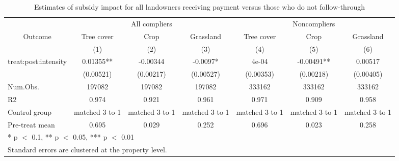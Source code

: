 \begin{table}[!h]
\centering\centering
\caption{\label{tab:twfe-compliers}Estimates of subsidy impact for all landowners receiving payment versus those who do not follow-through}
\centering
\begin{tabular}[t]{lcccccc}
\toprule
\multicolumn{1}{c}{ } & \multicolumn{3}{c}{All compliers} & \multicolumn{3}{c}{Noncompliers} \\
\cmidrule(l{3pt}r{3pt}){2-4} \cmidrule(l{3pt}r{3pt}){5-7}
\multicolumn{1}{c}{Outcome} & \multicolumn{1}{c}{Tree cover} & \multicolumn{1}{c}{Crop} & \multicolumn{1}{c}{Grassland} & \multicolumn{1}{c}{Tree cover} & \multicolumn{1}{c}{Crop} & \multicolumn{1}{c}{Grassland} \\
\cmidrule(l{3pt}r{3pt}){1-1} \cmidrule(l{3pt}r{3pt}){2-2} \cmidrule(l{3pt}r{3pt}){3-3} \cmidrule(l{3pt}r{3pt}){4-4} \cmidrule(l{3pt}r{3pt}){5-5} \cmidrule(l{3pt}r{3pt}){6-6} \cmidrule(l{3pt}r{3pt}){7-7}
  & (1) & (2) & (3) & (4) & (5) & (6)\\
\midrule
treat:post:intensity & 0.01355** & -0.00344 & -0.0097* & 4e-04 & -0.00491** & 0.00517\\
 & (0.00521) & (0.00217) & (0.00527) & (0.00353) & (0.00218) & (0.00405)\\
\midrule
Num.Obs. & 197082 & 197082 & 197082 & 333162 & 333162 & 333162\\
R2 & 0.974 & 0.921 & 0.961 & 0.971 & 0.909 & 0.958\\
Control group & matched 3-to-1 & matched 3-to-1 & matched 3-to-1 & matched 3-to-1 & matched 3-to-1 & matched 3-to-1\\
Pre-treat mean & 0.695 & 0.029 & 0.252 & 0.696 & 0.023 & 0.258\\
\bottomrule
\multicolumn{7}{l}{\rule{0pt}{1em}* p $<$ 0.1, ** p $<$ 0.05, *** p $<$ 0.01}\\
\multicolumn{7}{l}{\rule{0pt}{1em}Standard errors are clustered at the property level.}\\
\end{tabular}
\end{table}
